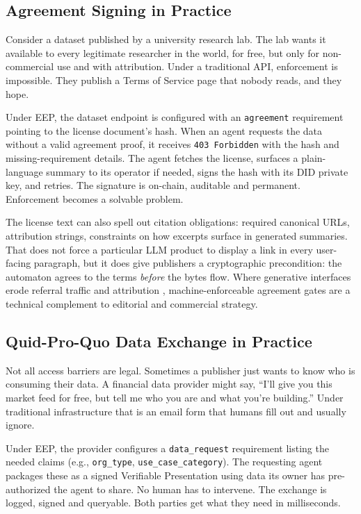 \documentclass[12pt,a4paper]{article}
\begin{document}
\subsection{Agreement Signing in Practice}

Consider a dataset published by a university research lab. The lab wants it available to every legitimate researcher in the world, for free, but only for non-commercial use and with attribution. Under a traditional API, enforcement is impossible. They publish a Terms of Service page that nobody reads, and they hope.

Under EEP, the dataset endpoint is configured with an \texttt{agreement} requirement pointing to the license document's hash. When an agent requests the data without a valid agreement proof, it receives \texttt{403 Forbidden} with the hash and missing-requirement details. The agent fetches the license, surfaces a plain-language summary to its operator if needed, signs the hash with its DID private key, and retries. The signature is on-chain, auditable and permanent. Enforcement becomes a solvable problem.

The license text can also spell out citation obligations: required canonical URLs, attribution strings, constraints on how excerpts surface in generated summaries. That does not force a particular LLM product to display a link in every user-facing paragraph, but it does give publishers a cryptographic precondition: the automaton agrees to the terms \emph{before} the bytes flow. Where generative interfaces erode referral traffic and attribution \cite{ref34,ref35}, machine-enforceable agreement gates are a technical complement to editorial and commercial strategy.

\subsection{Quid-Pro-Quo Data Exchange in Practice}

Not all access barriers are legal. Sometimes a publisher just wants to know who is consuming their data. A financial data provider might say, ``I'll give you this market feed for free, but tell me who you are and what you're building.'' Under traditional infrastructure that is an email form that humans fill out and usually ignore.

Under EEP, the provider configures a \texttt{data\_request} requirement listing the needed claims (e.g., \texttt{org\_type}, \texttt{use\_case\_category}). The requesting agent packages these as a signed Verifiable Presentation using data its owner has pre-authorized the agent to share. No human has to intervene. The exchange is logged, signed and queryable. Both parties get what they need in milliseconds.
\end{document}
